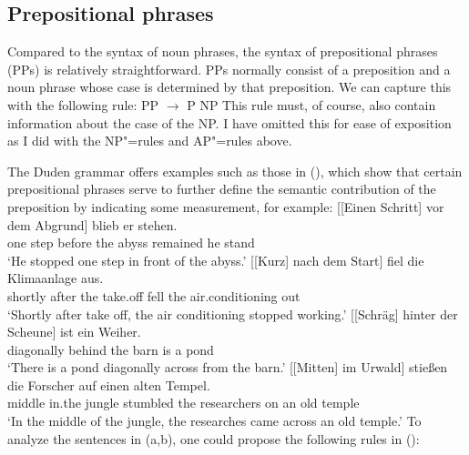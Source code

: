 \subsection{Prepositional phrases}
\label{Abschnitt-PP-Syntax}

Compared to the syntax of noun phrases, the syntax of prepositional phrases (PPs) is relatively straightforward. PPs normally 
consist of a preposition and a noun phrase whose case is determined by that preposition. We can capture this with the following
rule:
\ea
\label{Regel-PP-einfach}
PP $\to$ P NP
\z
This rule must, of course, also contain information about the case of the NP. I have omitted this for ease of exposition as I did
with the NP"=rules and AP"=rules above.

The Duden grammar \citep[§~1300]{Duden2005-Authors} offers examples such as those in (), which show that certain prepositional phrases
serve to further define the semantic contribution of the preposition by indicating some measurement, for example:
\eal
\ex\label{Beispiel-Schritt-vor-dem-Abgrund} 
\gll {}[[Einen Schritt] vor dem Abgrund] blieb er stehen.\\
	 {}\spacebr{}\spacebr{}one step before the abyss remained he stand\\
\glt `He stopped one step in front of the abyss.'
\ex 
\gll {}[[Kurz] nach dem Start] fiel die Klimaanlage aus.\\
	 {}\spacebr{}\spacebr{}shortly after the take.off fell the air.conditioning out\\
\glt `Shortly after take off, the air conditioning stopped working.'
\ex 
\gll {}[[Schräg] hinter der Scheune] ist ein Weiher.\\
	 {}\spacebr{}\spacebr{}diagonally behind the barn is a pond\\
\glt `There is a pond diagonally across from the barn.'
\ex 
\gll {}[[Mitten] im Urwald] stießen die Forscher auf einen alten Tempel.\\
	 {}\spacebr{}\spacebr{}middle in.the jungle stumbled the researchers on an old temple\\
\glt `In the middle of the jungle, the researches came across an old temple.'
\zl
To analyze the sentences in (a,b), one could propose the following rules in ():

